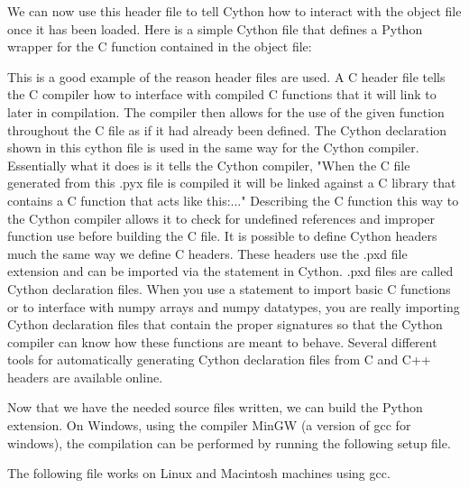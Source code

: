 

We can now use this header file to tell Cython how to interact with the object file once it has been loaded.
Here is a simple Cython file that defines a Python wrapper for the C function contained in the object file:



\begin{info}
This is a good example of the reason header files are used.
A C header file tells the C compiler how to interface with compiled C functions that it will link to later in compilation.
The compiler then allows for the use of the given function throughout the C file as if it had already been defined.
The Cython  declaration shown in this cython file is used in the same way for the Cython compiler.
Essentially what it does is it tells the Cython compiler, "When the C file generated from this .pyx file is compiled it will be linked against a C library that contains a C function that acts like this:..."
Describing the C function this way to the Cython compiler allows it to check for undefined references and improper function use before building the C file.
It is possible to define Cython headers much the same way we define C headers.
These headers use the .pxd file extension and can be imported via the  statement in Cython.
.pxd files are called Cython declaration files.
When you use a  statement to import basic C functions or to interface with numpy arrays and numpy datatypes, you are really importing Cython declaration files that contain the proper signatures so that the Cython compiler can know how these functions are meant to behave.
Several different tools for automatically generating Cython declaration files from C and C++ headers are available online.
\end{info}

Now that we have the needed source files written, we can build the Python extension.
On Windows, using the compiler MinGW (a version of gcc for windows), the compilation can be performed by running the following setup file.



The following file works on Linux and Macintosh machines using gcc.

